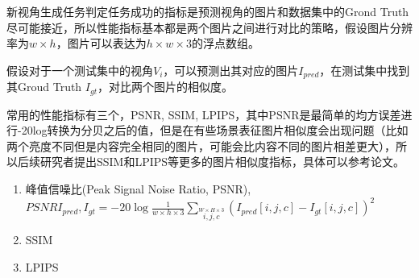 新视角生成任务判定任务成功的指标是预测视角的图片和数据集中的Grond Truth尽可能接近，所以性能指标基本都是两个图片之间进行对比的策略，假设图片分辨率为$w\times h$，图片可以表达为$h\times w\times 3$的浮点数组。


假设对于一个测试集中的视角$V_i$，可以预测出其对应的图片$I_{pred}$，在测试集中找到其Groud Truth $I_{gt}$，对比两个图片的相似度。

常用的性能指标有三个，PSNR, SSIM, LPIPS，其中PSNR是最简单的均方误差进行-20log转换为分贝之后的值，但是在有些场景表征图片相似度会出现问题（比如两个亮度不同但是内容完全相同的图片，可能会比内容不同的图片相差更大），所以后续研究者提出SSIM和LPIPS等更多的图片相似度指标，具体可以参考论文。

\begin{enumerate}
    \item 峰值信噪比(Peak Signal Noise Ratio, PSNR), $PSNR{I_{pred},I_{gt}}=-20\log{\frac{1}{w\times h\times 3}\sum\limits_{i,j,c}\limits^{W\times H\times 3} (I_{pred}[i,j,c]-I_{gt}[i,j,c])^2}$
    \item SSIM 
    \item LPIPS
\end{enumerate}

